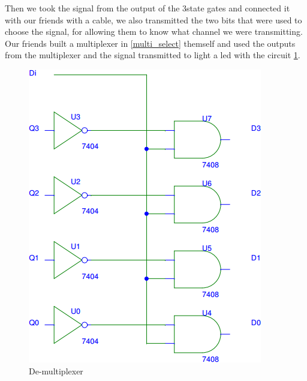 Then we took the signal from the output of the 3state gates and connected it with our friends with a cable, we also transmitted the two bits that were used to choose the signal, for allowing them to know what channel we were transmitting. Our friends built a multiplexer in \ref{multi_select} themself and used the outputs from the multiplexer and the signal transmitted to light a led with the circuit \ref{demulti}.
\begin{figure}[H]
\centering
\includegraphics[width=.7\textwidth]{10/demulti.png}
\caption{De-multiplexer}\label{demulti}
\end{figure}


